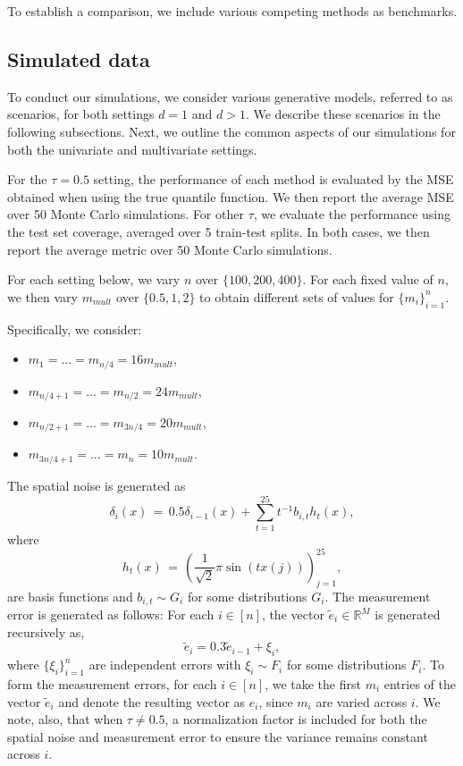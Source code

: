 \documentclass[twoside,11pt]{article}
\newcommand{\rev}[1]{{\color{revisionred}#1}}
\begin{document}
To establish a comparison, we include various competing methods as benchmarks. 

\subsection{Simulated data}
\label{subsec:simulated_data}
To conduct our simulations, we consider various generative models, referred to as scenarios, for both settings \( d = 1 \) and \( d > 1 \). We describe these scenarios in the following subsections. Next, we outline the common aspects of our simulations for both the univariate and multivariate settings.

For the $\tau = 0.5$ setting, the performance of each method is evaluated by the MSE obtained when using the true quantile function. We then report the average MSE over 50 Monte Carlo simulations. For other $\tau$, we evaluate the performance using the test set coverage, averaged over 5 train-test splits. In both cases, we then report the average metric over 50 Monte Carlo simulations. 

\rev{For each setting below, we vary \( n \) over \( \{100, 200, 400\} \). For each fixed value of \( n \), we then vary \( m_{mult} \) over \( \{0.5, 1, 2\} \) to obtain different sets of values for \( \{m_i\}_{i=1}^{n} \).}


 Specifically, we consider:
\begin{itemize}
    \item \( m_1 = \ldots = m_{n/4} = 16m_{mult} \),
    \item \( m_{n/4+1} = \ldots = m_{n/2} = 24m_{mult} \),
    \item \( m_{n/2+1} = \ldots = m_{3n/4} = 20m_{mult} \),
    \item \( m_{3n/4+1} = \ldots = m_n = 10m_{mult} \).
\end{itemize}



The spatial noise is generated as 
\begin{equation}\label{eq:st_delta_def}
\delta_i(x) \,=\, 0.5\delta_{i-1}(x) + \sum_{t=1}^{25} t^{-1}b_{i,t}h_t(x), 
\end{equation}
where
\begin{equation}
\label{eq:h_t_def}
h_t(x) \,=\, \left(\frac{1}{\sqrt{2}}\pi \sin(tx(j))\right)_{j=1}^{25},
\end{equation}
are basis functions and $b_{i,t}\sim G_i$ for some distributions $G_i$. The measurement error is generated as follows: For each \(i \in [n]\), the vector \(\tilde e_i \in \mathbb{R}^M\) is generated recursively as, 
\begin{equation}\label{eq:st_e_def}
\tilde e_i = 0.3 \tilde e_{i-1} + \xi_i,
\end{equation}
where \(\{\xi_{i}\}_{i=1}^{n}\) are independent errors with $\xi_i \sim F_i$ for some distributions $F_i$. To form the measurement errors, for each \(i \in [n]\), we take the first \(m_i\) entries of the vector \(\tilde e_i\) and denote the resulting vector as \(e_i\), since $m_i$ are varied across $i$. We note, also, that when $\tau \neq 0.5$, a normalization factor is included for both the spatial noise and measurement error to ensure the variance remains constant across $i$. 
\end{document}

